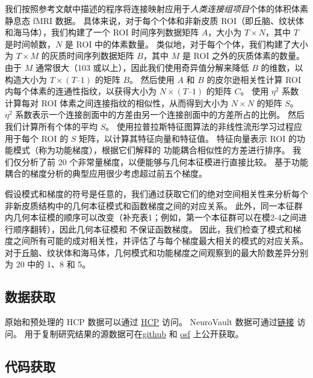 \documentclass[lang=cn,a4paper,newtx]{elegantpaper}
\begin{document}
我们按照参考文献中描述的程序将连接映射应用于\textit{人类连接组项目}个体的体积体素静息态 fMRI 数据\cite{haak2018connectopic}。
具体来说，对于每个个体和非新皮质 ROI（即丘脑、纹状体和海马体），我们构建了一个 ROI 时间序列数据矩阵 $ A $，大小为 $ T \times N $，其中 $ T $ 是时间帧数，$ N $ 是 ROI 中的体素数量。
类似地，对于每个个体，我们构建了大小为 $ T \times M $ 的灰质时间序列数据矩阵 $ B $，其中 $ M $ 是 ROI 之外的灰质体素的数量。
由于 $ M $ 通常很大（103 或以上），因此我们使用奇异值分解来降低 $ B $ 的维数，以构造大小为 $ T \times (T – 1) $ 的矩阵 $ B $。
然后使用 $ A $ 和 $ B $ 的皮尔逊相关性计算 ROI 内每个体素的连通性指纹，以获得大小为 $ N \times (T – 1) $ 的矩阵 $ C $。
使用 $ \eta^2 $ 系数 \cite{alexander2018testing} 计算每对 ROI 体素之间连接指纹的相似性，从而得到大小为 $ N \times N $ 的矩阵 $ S $。
$ \eta^2 $ 系数表示一个连接剖面中的方差由另一个连接剖面中的方差所占的比例。
然后我们计算所有个体的平均 $ S $。 
使用拉普拉斯特征图算法\cite{belkin2003laplacian}的非线性流形学习过程应用于每个 ROI 的 $ S $ 矩阵，以计算其特征向量和特征值。
特征向量表示 ROI 的功能模式（称为功能梯度），根据它们解释的 功能耦合相似性的方差进行排序。
我们仅分析了前 20 个非常量梯度，以便能够与几何本征模进行直接比较。
基于功能耦合的梯度分析的典型应用很少考虑超过前五个梯度\cite{haak2018connectopic,margulies2016situating}。


假设模式和梯度的符号是任意的，我们通过获取它们的绝对空间相关性来分析每个非新皮质结构中的几何本征模式和函数梯度之间的对应关系。
此外，同一本征群内几何本征模的顺序可以改变（补充表1；例如，第一个本征群可以在模2-4之间进行顺序翻转），因此几何本征模和 不保证函数梯度。
因此，我们检查了模式和梯度之间所有可能的成对相关性，并评估了与每个梯度最大相关的模式的对应关系。
对于丘脑、纹状体和海马体，几何模式和功能梯度之间观察到的最大阶数差异分别为 20 中的 1、8 和 5。


\subsection{数据获取} \label{sec:data_availability}

原始和预处理的 HCP 数据可以通过 \href{https://db. human connectome.org/}{HCP} 访问。
NeuroVault 数据可通过\href{https://neurovault.org/}{链接} 访问。
用于复制研究结果的源数据可在\href{https://github.com/NSBLab/BrainEigenmodes}{github}  和 \href{https://osf.io/xczmp/}{osf} 上公开获取。

\subsection{代码获取} \label{sec:code_availability}
\end{document}
